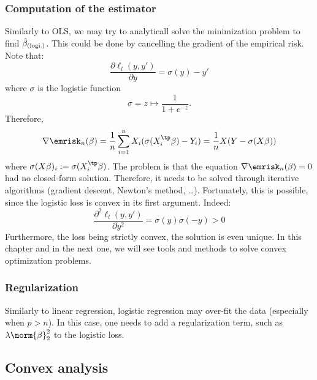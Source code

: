 \documentclass[toc, titlepaged]{../cs-classes/cs-classes}
\begin{document}
\subsubsection{Computation of the estimator}
Similarly to OLS, we may try to analyticall solve the minimization problem to find $\hat{\beta}_{(\textnormal{logi.})}$. This could be done by cancelling the gradient of the empirical risk. Note that:
\begin{equation*}
    \frac{\partial\ell_l(y, y')}{\partial y} = \sigma(y)-y'
\end{equation*}
where $\sigma$ is the logistic function
\begin{equation*}
    \sigma = z \longmapsto \frac{1}{1+e^{-z}}.
\end{equation*}
Therefore,
\begin{equation*}
    \nabla\emrisk_n(\beta) = \frac{1}{n}\sum_{i=1}^nX_i(\sigma(X_i^\tp\beta)-Y_i)=\frac{1}{n}X(Y-\sigma(X\beta))
\end{equation*}
where $\sigma(X\beta)_i:=\sigma(X_i^\tp\beta)$. The problem is that the equation $\nabla\emrisk_n(\beta)=0$ had no closed-form solution. Therefore, it needs to be solved through iterative algorithms (gradient descent, Newton's method, \dots). Fortunately, this is possible, since the logistic loss is convex in its first argument. Indeed:
\begin{equation*}
    \frac{\partial^2\ell_l(y, y')}{\partial y^2} = \sigma(y)\sigma(-y)>0
\end{equation*}
Furthermore, the loss being strictly convex, the solution is even unique. In this chapter and in the next one, we will see tools and methods to solve convex optimization problems.

\subsubsection{Regularization}
Similarly to linear regression, logistic regression may over-fit the data (especially when $p>n$). In this case, one needs to add a regularization term, such as $\lambda\norm{\beta}^2_2$ to the logistic loss.

\subsection{Convex analysis}
\end{document}
